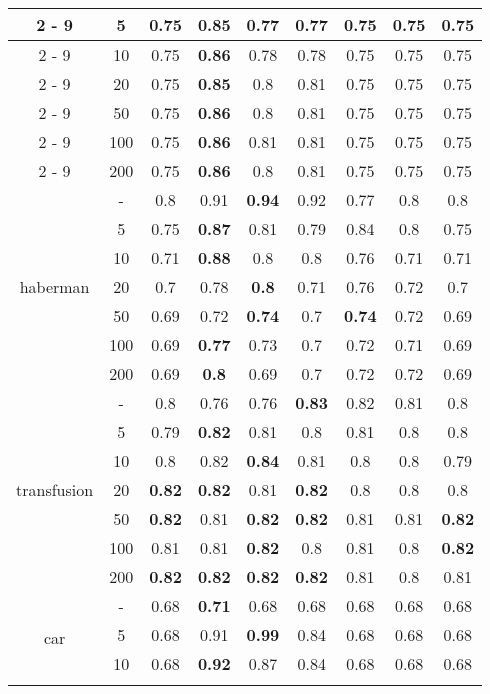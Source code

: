 \documentclass{article}%
\begin{document}
\begin{longtable}{c|c|ccccccc}
\cline{2%
-%
9}%
&5&0.75&\textbf{0.85}&0.77&0.77&0.75&0.75&0.75\\%
\cline{2%
-%
9}%
&10&0.75&\textbf{0.86}&0.78&0.78&0.75&0.75&0.75\\%
\cline{2%
-%
9}%
&20&0.75&\textbf{0.85}&0.8&0.81&0.75&0.75&0.75\\%
\cline{2%
-%
9}%
&50&0.75&\textbf{0.86}&0.8&0.81&0.75&0.75&0.75\\%
\cline{2%
-%
9}%
&100&0.75&\textbf{0.86}&0.81&0.81&0.75&0.75&0.75\\%
\cline{2%
-%
9}%
&200&0.75&\textbf{0.86}&0.8&0.81&0.75&0.75&0.75\\%
\hline%
\multirow{7}{*}{haberman}&{-}&0.8&0.91&\textbf{0.94}&0.92&0.77&0.8&0.8\\%
\cline{2%
-%
9}%
&5&0.75&\textbf{0.87}&0.81&0.79&0.84&0.8&0.75\\%
\cline{2%
-%
9}%
&10&0.71&\textbf{0.88}&0.8&0.8&0.76&0.71&0.71\\%
\cline{2%
-%
9}%
&20&0.7&0.78&\textbf{0.8}&0.71&0.76&0.72&0.7\\%
\cline{2%
-%
9}%
&50&0.69&0.72&\textbf{0.74}&0.7&\textbf{0.74}&0.72&0.69\\%
\cline{2%
-%
9}%
&100&0.69&\textbf{0.77}&0.73&0.7&0.72&0.71&0.69\\%
\cline{2%
-%
9}%
&200&0.69&\textbf{0.8}&0.69&0.7&0.72&0.72&0.69\\%
\hline%
\multirow{7}{*}{transfusion}&{-}&0.8&0.76&0.76&\textbf{0.83}&0.82&0.81&0.8\\%
\cline{2%
-%
9}%
&5&0.79&\textbf{0.82}&0.81&0.8&0.81&0.8&0.8\\%
\cline{2%
-%
9}%
&10&0.8&0.82&\textbf{0.84}&0.81&0.8&0.8&0.79\\%
\cline{2%
-%
9}%
&20&\textbf{0.82}&\textbf{0.82}&0.81&\textbf{0.82}&0.8&0.8&0.8\\%
\cline{2%
-%
9}%
&50&\textbf{0.82}&0.81&\textbf{0.82}&\textbf{0.82}&0.81&0.81&\textbf{0.82}\\%
\cline{2%
-%
9}%
&100&0.81&0.81&\textbf{0.82}&0.8&0.81&0.8&\textbf{0.82}\\%
\cline{2%
-%
9}%
&200&\textbf{0.82}&\textbf{0.82}&\textbf{0.82}&\textbf{0.82}&0.81&0.8&0.81\\%
\hline%
\multirow{7}{*}{car}&{-}&0.68&\textbf{0.71}&0.68&0.68&0.68&0.68&0.68\\%
\cline{2%
-%
9}%
&5&0.68&0.91&\textbf{0.99}&0.84&0.68&0.68&0.68\\%
\cline{2%
-%
9}%
&10&0.68&\textbf{0.92}&0.87&0.84&0.68&0.68&0.68\\%
\cline{2%
}
\end{longtable}
\end{document}
